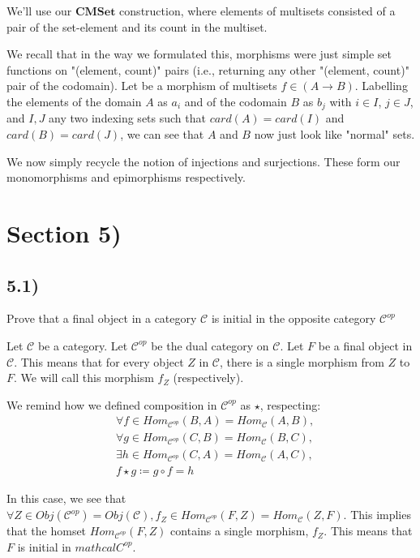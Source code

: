 \documentclass[12pt, letterpaper, twoside]{report}
\begin{document}
We'll use our $\mathbf{CMSet}$ construction, where elements of multisets consisted of a pair of the set-element and its count in the multiset. 

We recall that in the way we formulated this, morphisms were just simple set functions on "(element, count)" pairs (i.e., returning any other "(element, count)" pair of the codomain). Let be a morphism of multisets $f \in (A \to B)$. Labelling the elements of the domain $A$ as $a_i$ and of the codomain $B$ as $b_j$ with $i \in I$, $j \in J$, and $I, J$ any two indexing sets such that $card(A) = card(I)$ and $card(B) = card(J)$, we can see that $A$ and $B$ now just look like "normal" sets.

We now simply recycle the notion of injections and surjections. These form our monomorphisms and epimorphisms respectively.


\section*{Section 5)}

\subsection*{5.1)}

Prove that a final object in a category $\mathcal{C}$ is initial in the opposite category $\mathcal{C}^{op}$

Let $\mathcal{C}$ be a category. Let $\mathcal{C}^{op}$ be the dual category on $\mathcal{C}$. Let $F$ be a final object in $\mathcal{C}$. This means that for every object $Z$ in $\mathcal{C}$, there is a single morphism from $Z$ to $F$. We will call this morphism $f_Z$ (respectively).

We remind how we defined composition in $\mathcal{C}^{op}$ as $\star$, respecting:
$$
\begin{aligned}
	& \forall f \in Hom_{\mathcal{C}^{op}} (B, A) = Hom_{\mathcal{C}} (A, B), \\
	& \forall g \in Hom_{\mathcal{C}^{op}} (C, B) = Hom_{\mathcal{C}} (B, C), \\
	& \exists h \in Hom_{\mathcal{C}^{op}} (C, A) = Hom_{\mathcal{C}} (A, C), \\
	& f \star g \coloneqq g \circ f = h
\end{aligned}
$$

In this case, we see that $\forall Z \in Obj(\mathcal{C}^{op}) = Obj(\mathcal{C}), f_Z \in Hom_{\mathcal{C}^{op}} (F, Z) = Hom_{\mathcal{C}} (Z, F)$. This implies that the homset $Hom_{\mathcal{C}^{op}} (F, Z)$ contains a single morphism, $f_Z$. This means that $F$ is initial in $mathcal{C}^{op}$.
\end{document}
